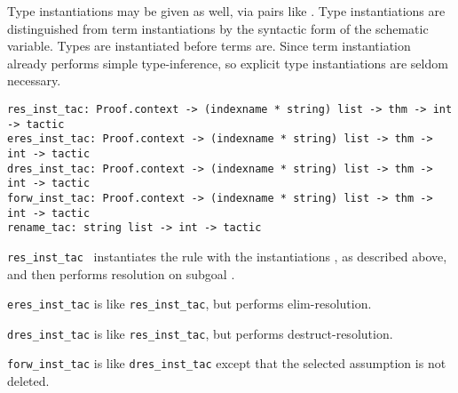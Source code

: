 \begin{isabellebody}
\begin{isamarkuptext}
  Type instantiations may be given as well, via pairs like .  Type instantiations are distinguished from term
  instantiations by the syntactic form of the schematic variable.
  Types are instantiated before terms are.  Since term instantiation
  already performs simple type-inference, so explicit type
  instantiations are seldom necessary.%
\end{isamarkuptext}%
\isamarkuptrue%
%
\isadelimmlref
%
\endisadelimmlref
%
\isatagmlref
%
\begin{isamarkuptext}%
\begin{mldecls}
  \verb|res_inst_tac: Proof.context -> (indexname * string) list -> thm -> int -> tactic| \\
  \verb|eres_inst_tac: Proof.context -> (indexname * string) list -> thm -> int -> tactic| \\
  \verb|dres_inst_tac: Proof.context -> (indexname * string) list -> thm -> int -> tactic| \\
  \verb|forw_inst_tac: Proof.context -> (indexname * string) list -> thm -> int -> tactic| \\[1ex]
  \verb|rename_tac: string list -> int -> tactic| \\
  \end{mldecls}

  \begin{description}

  \item \verb|res_inst_tac|~ instantiates the
  rule  with the instantiations , as described
  above, and then performs resolution on subgoal .
  
  \item \verb|eres_inst_tac| is like \verb|res_inst_tac|, but performs
  elim-resolution.

  \item \verb|dres_inst_tac| is like \verb|res_inst_tac|, but performs
  destruct-resolution.

  \item \verb|forw_inst_tac| is like \verb|dres_inst_tac| except that
  the selected assumption is not deleted.


\end{description}
\end{isamarkuptext}
\end{isabellebody}
